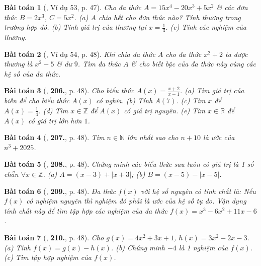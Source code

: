 \documentclass{article}
\numberwithin{equation}{section}
\newtheorem{baitoan}{Bài toán}
\begin{document}
\begin{baitoan}[\cite{Tuyen_Toan_7}, Ví dụ 53, p. 47]
	Cho đa thức $A = 15x^4 - 20x^3 + 5x^2$ \& các đơn thức $B = 2x^3$, $C = 5x^2$. (a) $A$ chia hết cho đơn thức nào? Tính thương trong trường hợp đó. (b) Tính giá trị của thương tại $x = \frac{1}{3}$. (c) Tính các nghiệm của thương.
\end{baitoan}

\begin{baitoan}[\cite{Tuyen_Toan_7}, Ví dụ 54, p. 48]
	Khi chia đa thức $A$ cho đa thức $x^2 + 2$ ta được thương là $x^2 - 5$ \& dư $9$. Tìm đa thức $A$ \& cho biết bậc của đa thức này cùng các hệ số của đa thức.
\end{baitoan}

\begin{baitoan}[\cite{Tuyen_Toan_7}, \textbf{206.}, p. 48]
	Cho biểu thức $A(x) = \frac{x + 2}{x - 1}$. (a) Tìm giá trị của biến để cho biểu thức $A(x)$ có nghĩa. (b) Tính $A(7)$. (c) Tìm $x$ để $A(x) = \frac{1}{4}$. (d) Tìm $x\in\mathbb{Z}$ để $A(x)$ có giá trị nguyên. (e) Tìm $x\in\mathbb{R}$ để $A(x)$ có giá trị lớn hơn $1$.
\end{baitoan}

\begin{baitoan}[\cite{Tuyen_Toan_7}, \textbf{207.}, p. 48]
	Tìm $n\in\mathbb{N}$ lớn nhất sao cho $n + 10$ là ước của $n^3 + 2025$.
\end{baitoan}

\begin{baitoan}[\cite{Tuyen_Toan_7}, \textbf{208.}, p. 48]
	Chứng minh các biểu thức sau luôn có giá trị là 1 số chẵn $\forall x\in\mathbb{Z}$. (a) $A = (x - 3) + |x + 3|$; (b) $B = (x - 5) - |x - 5|$.
\end{baitoan}

\begin{baitoan}[\cite{Tuyen_Toan_7}, \textbf{209.}, p. 48]
	Đa thức $f(x)$ với hệ số nguyên có tính chất là: Nếu $f(x)$ có nghiệm nguyên thì nghiệm đó phải là ước của hệ số tự do. Vận dụng tính chất này để tìm tập hợp các nghiệm của đa thức $f(x) = x^3 - 6x^2 + 11x - 6$.
\end{baitoan}

\begin{baitoan}[\cite{Tuyen_Toan_7}, \textbf{210.}, p. 48]
	Cho $g(x) = 4x^2 + 3x + 1$, $h(x) = 3x^2 - 2x - 3$. (a) Tính $f(x) = g(x) - h(x)$. (b) Chứng minh $-4$ là 1 nghiệm của $f(x)$. (c) Tìm tập hợp nghiệm của $f(x)$.
\end{baitoan}
\end{document}
